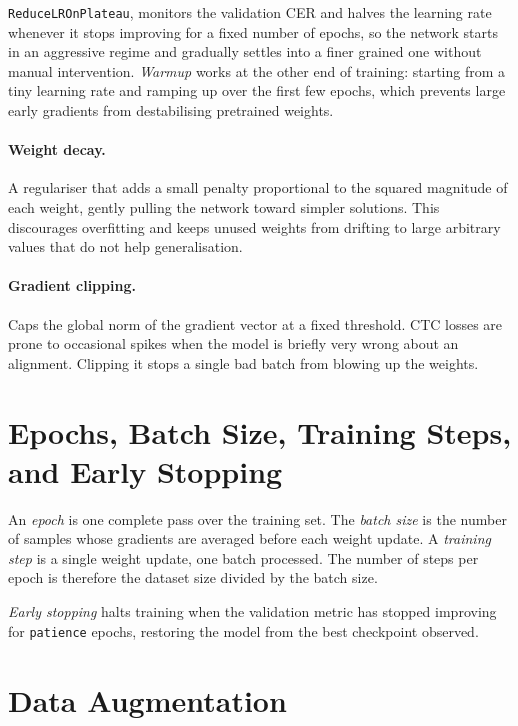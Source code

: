 \texttt{ReduceLROnPlateau}, monitors the validation CER and halves the learning rate whenever it stops improving for a fixed number of epochs, so the network starts in an aggressive regime and gradually settles into a finer grained one without manual intervention. \textit{Warmup} works at the other end of training: starting from a tiny learning rate and ramping up over the first few epochs, which prevents large early gradients from destabilising pretrained weights.

\paragraph{Weight decay.} A regulariser that adds a small penalty proportional to the squared magnitude of each weight, gently pulling the network toward simpler solutions. This discourages overfitting and keeps unused weights from drifting to large arbitrary values that do not help generalisation.

\paragraph{Gradient clipping.} Caps the global norm of the gradient vector at a fixed threshold. 
CTC losses are prone to occasional spikes when the model is briefly very wrong about an alignment. Clipping it stops a single bad batch from blowing up the weights.

\section{Epochs, Batch Size, Training Steps, and Early Stopping}
\label{sec:appendix-training-loop}

An \textit{epoch} is one complete pass over the training set. The \textit{batch size} is the number of samples whose gradients are averaged before each weight update.
A \textit{training step} is a single weight update, one batch processed. The number of steps per epoch is therefore the dataset size divided by the batch size.

\textit{Early stopping} halts training when the validation metric has stopped improving for \texttt{patience} epochs, restoring the model from the best checkpoint observed.

\section{Data Augmentation}
\label{sec:appendix-augmentation}

